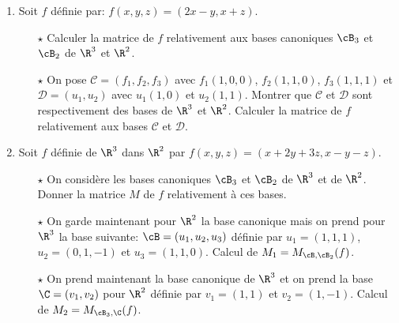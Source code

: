 \documentclass[a4paper, 11pt]{article}
\begin{document}
\setlength\fboxrule{1pt}
\setlength\fboxrule{0.5pt}

{\footnotesize \begin{exercice} 
\begin{enumerate}
\item Soit $f$ d\'efinie par: $f(x,y,z)=(2x-y,x+z)$. 
\begin{itemize}
\item[$\star$] Calculer la matrice de $f$ relativement aux bases canoniques $\cB_3$ et $\cB_2$ de $\R^3$ et $\R^2$.
\item[$\star$] On pose $\mathcal{C}=(f_1,f_2,f_3)$ avec $f_1(1,0,0)$, $f_2(1,1,0)$, $f_3(1,1,1)$ et $\mathcal{D}=(u_1,u_2)$ avec $u_1(1,0)$ et $u_2(1,1)$. Montrer que $\mathcal{C}$ et $\mathcal{D}$ sont respectivement des bases de $\R^3$ et $\R^2$. Calculer la matrice de $f$ relativement aux bases $\mathcal{C}$ et $\mathcal{D}$.
\end{itemize}
\item Soit $f$ d\'efinie de $\R^3$ dans $\R^2$ par $f(x,y,z)=(x+2y+3z, x-y-z)$. 
\begin{itemize}
\item[$\star$] On consid\`ere les bases canoniques $\cB_3$ et $\cB_2$ de $\R^3$ et de $\R^2$. Donner la matrice $M$ de $f$ relativement \`a ces bases.
\item[$\star$] On garde maintenant pour $\R^2$ la base canonique mais on prend pour $\R^3$ la base suivante: $\cB=(u_1,u_2,u_3)$ d\'efinie par $u_1=(1,1,1)$, $u_2=(0,1,-1)$ et $u_3=(1,1,0)$. Calcul de $M_1=M_{\cB,\cB_2}(f)$.
\item[$\star$] On prend maintenant la base canonique de $\R^3$ et on prend la base $\C=(v_1,v_2)$ pour $\R^2$ d\'efinie par $v_1=(1,1)$ et $v_2=(1,-1)$. Calcul de $M_2=M_{\cB_3,\C}(f)$.
\end{itemize}
\end{enumerate}
\end{exercice}
}
\end{document}
